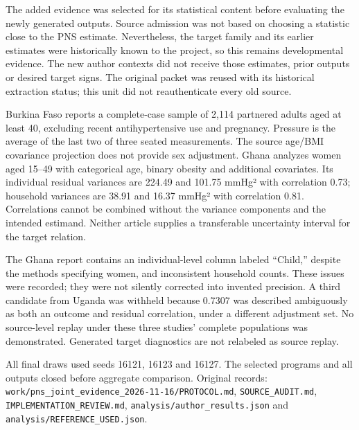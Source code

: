 \documentclass[11pt,letterpaper]{article}
\begin{document}
\endgroup

The added evidence was selected for its statistical content before evaluating the newly generated outputs. Source admission was not based on choosing a statistic close to the PNS estimate. Nevertheless, the target family and its earlier estimates were historically known to the project, so this remains developmental evidence. The new author contexts did not receive those estimates, prior outputs or desired target signs. The original packet was reused with its historical extraction status; this unit did not reauthenticate every old source.


Burkina Faso reports a complete-case sample of 2,114 partnered adults aged at least 40, excluding recent antihypertensive use and pregnancy. Pressure is the average of the last two of three seated measurements. The source age/\allowbreak{}BMI covariance projection does not provide sex adjustment. Ghana analyzes women aged 15–\allowbreak{}49 with categorical age, binary obesity and additional covariates. Its individual residual variances are 224.49 and 101.75 mmHg² with correlation 0.73; household variances are 38.91 and 16.37 mmHg² with correlation 0.81. Correlations cannot be combined without the variance components and the intended estimand. Neither article supplies a transferable uncertainty interval for the target relation.


The Ghana report contains an individual-level column labeled “Child,” despite the methods specifying women, and inconsistent household counts. These issues were recorded; they were not silently corrected into invented precision. A third candidate from Uganda was withheld because 0.7307 was described ambiguously as both an outcome and residual correlation, under a different adjustment set. No source-level replay under these three studies' complete populations was demonstrated. Generated target diagnostics are not relabeled as source replay.


All final draws used seeds 16121, 16123 and 16127. The selected programs and all outputs closed before aggregate comparison. Original records: \texttt{work/\allowbreak{}pns\_\allowbreak{}joint\_\allowbreak{}evidence\_\allowbreak{}2026-\allowbreak{}11-\allowbreak{}16/\allowbreak{}PROTOCOL.md}, \texttt{SOURCE\_\allowbreak{}AUDIT.md}, \texttt{IMPLEMENTATION\_\allowbreak{}REVIEW.md}, \texttt{analysis/\allowbreak{}author\_\allowbreak{}results.json} and \texttt{analysis/\allowbreak{}REFERENCE\_\allowbreak{}USED.json}.


\FloatBarrier
\end{document}
